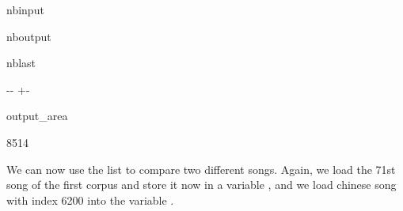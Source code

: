 \documentclass[letterpaper,10pt,english]{sphinxmanual}
\newlength\nbsphinxcodecellspacing
\begin{document}
\begin{sphinxuseclass}{nbinput}
{
\begin{sphinxVerbatim}[commandchars=\\\{\}]
\llap{\color{nbsphinxin}[18]:\,\hspace{\fboxrule}\hspace{\fboxsep}}
\end{sphinxVerbatim}
}

\end{sphinxuseclass}
\begin{sphinxuseclass}{nboutput}
\begin{sphinxuseclass}{nblast}
{

\kern-\sphinxverbatimsmallskipamount\kern-\baselineskip
\kern+\FrameHeightAdjust\kern-\fboxrule
\vspace{\nbsphinxcodecellspacing}

\begin{sphinxuseclass}{output_area}
\begin{sphinxuseclass}{}


\begin{sphinxVerbatim}[commandchars=\\\{\}]
\llap{\color{nbsphinxout}[18]:\,\hspace{\fboxrule}\hspace{\fboxsep}}8514
\end{sphinxVerbatim}



\end{sphinxuseclass}
\end{sphinxuseclass}
}

\end{sphinxuseclass}
\end{sphinxuseclass}
\sphinxAtStartPar
We can now use the list  to compare two different songs. Again, we load the 71st song of the first corpus and store it now in a variable , and we load chinese song with index 6200 into the variable .
\end{document}
